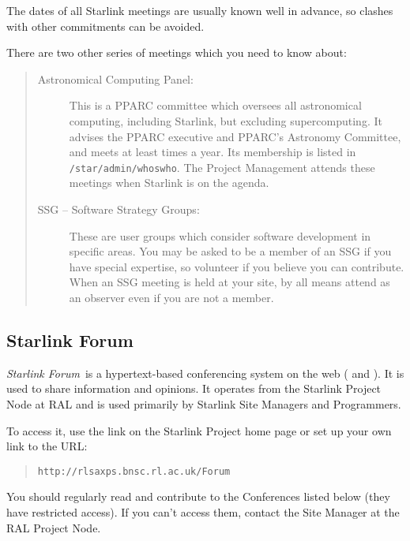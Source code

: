 The dates of all Starlink meetings are usually known well in advance, so clashes
with other commitments can be avoided.
 
There are two other series of meetings which you need to know about:

\begin{quote}
\begin{description}

\item [Astronomical Computing Panel:]
This is a PPARC committee which oversees all astronomical computing,
including Starlink, but excluding supercomputing.
It advises the PPARC executive and PPARC's Astronomy Committee, and meets at
least times a year.
Its membership is listed in {\tt /star/admin/whoswho}.
The Project Management attends these meetings when Starlink is on the agenda.

\item [SSG -- Software Strategy Groups:]
These are user groups which consider software development in specific areas.
You may be asked to be a member of an SSG if you have special expertise,
so volunteer if you believe you can contribute.
When an SSG meeting is held at your site, by all means attend as an observer
even if you are not a member.

\end{description}
\end{quote}

\subsection {Starlink Forum}

{\em Starlink Forum}\, is a hypertext-based conferencing system on the web
( and 
).
It is used to share information and opinions.
It operates from the Starlink Project Node at RAL and is used primarily by
Starlink Site Managers and Programmers.

To access it, use the
link on the Starlink Project home page or set
up your own link to the URL:
\begin{quote}
{\tt http://rlsaxps.bnsc.rl.ac.uk/Forum}
\end{quote}
You should regularly read and contribute to the Conferences listed below
(they have restricted access).
If you can't access them, contact the Site Manager at the RAL Project Node.

